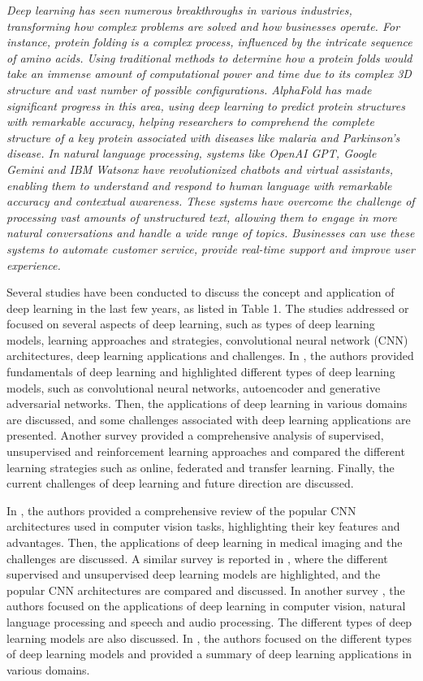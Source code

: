 \documentclass[preprint,12pt]{elsarticle}
\begin{document}
\emph{Deep learning has seen numerous breakthroughs in various industries, transforming how complex problems are solved and how businesses operate. For instance, protein folding is a complex process, influenced by the intricate sequence of amino acids. Using traditional methods to determine how a protein folds would take an immense amount of computational power and time due to its complex 3D structure and vast number of possible configurations. AlphaFold has made significant progress in this area, using deep learning to predict protein structures with remarkable accuracy, helping researchers to comprehend the complete structure of a key protein associated with diseases like malaria and Parkinson's disease. In natural language processing, systems like OpenAI GPT, Google Gemini and IBM Watsonx have revolutionized chatbots and virtual assistants, enabling them to understand and respond to human language with remarkable accuracy and contextual awareness. These systems have overcome the challenge of processing vast amounts of unstructured text, allowing them to engage in more natural conversations and handle a wide range of topics. Businesses can use these systems to automate customer service, provide real-time support and improve user experience.}

Several studies have been conducted to discuss the concept and application of deep learning in the last few years, as listed in Table 1. The studies addressed or focused on several aspects of deep learning, such as types of deep learning models, learning approaches and strategies, convolutional neural network (CNN) architectures, deep learning applications and challenges. In \cite{dong_survey_2021}, the authors provided fundamentals of deep learning and highlighted different types of deep learning models, such as convolutional neural networks, autoencoder and generative adversarial networks. Then, the applications of deep learning in various domains are discussed, and some challenges associated with deep learning applications are presented. Another survey \cite{talaei_khoei_deep_2023} provided a comprehensive analysis of supervised, unsupervised and reinforcement learning approaches and compared the different learning strategies such as online, federated and transfer learning. Finally, the current challenges of deep learning and future direction are discussed.

In \citep{alzubaidi_review_2021}, the authors provided a comprehensive review of the popular CNN architectures used in computer vision tasks, highlighting their key features and advantages. Then, the applications of deep learning in medical imaging and the challenges are discussed. A similar survey is reported in \citep{alom_state_art_2019}, where the different supervised and unsupervised deep learning models are highlighted, and the popular CNN architectures are compared and discussed. In another survey \citep{pouyanfar_survey_2018}, the authors focused on the applications of deep learning in computer vision, natural language processing and speech and audio processing. The different types of deep learning models are also discussed. In \citep{sarker_deep_2021}, the authors focused on the different types of deep learning models and provided a summary of deep learning applications in various domains.
\end{document}
